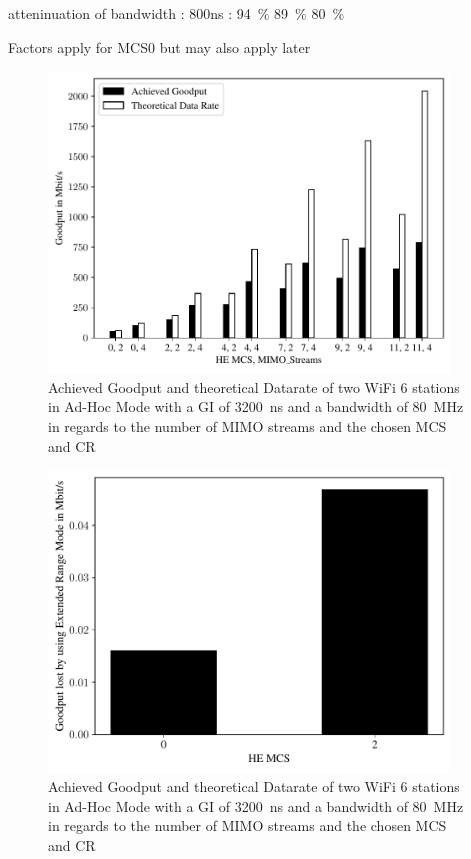 \documentclass[]{nsm-thesis}
\begin{document}
atteninuation of bandwidth : 800ns : \SI{94}{\percent} \SI{89}{\percent} \SI{80}{\percent}

Factors apply for MCS0 but may also apply later

\begin{figure}%
	\centering
	\includegraphics[width=0.95\textwidth]{figures/mimo_dataRate_simulation.pdf}
	\caption{Achieved Goodput and theoretical Datarate of two WiFi 6 stations in Ad-Hoc Mode with a \ac{GI} of \SI{3200}{\nano\second} and a bandwidth of \SI{80}{\mega\hertz} in regards to the number of \ac{MIMO} streams and the chosen \ac{MCS} and \ac{CR}}%
	\label{fig:Data_rate_Mimo}%
\end{figure}


\begin{figure}%
	\centering
	\includegraphics[width=0.95\textwidth]{figures/ER_dataRate_simulation.pdf}
	\caption{Achieved Goodput and theoretical Datarate of two WiFi 6 stations in Ad-Hoc Mode with a \ac{GI} of \SI{3200}{\nano\second} and a bandwidth of \SI{80}{\mega\hertz} in regards to the number of \ac{MIMO} streams and the chosen \ac{MCS} and \ac{CR}}%
	\label{fig:Data_rate_ER}%
\end{figure}
\end{document}
